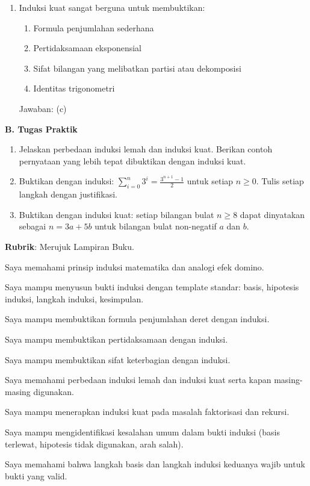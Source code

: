 \documentclass[../main]{subfiles}
\begin{document}
\begin{asesmen}
\begin{enumerate}
  \item Induksi kuat sangat berguna untuk membuktikan:
  \begin{enumerate}
    \item Formula penjumlahan sederhana
    \item Pertidaksamaan eksponensial
    \item Sifat bilangan yang melibatkan partisi atau dekomposisi
    \item Identitas trigonometri
  \end{enumerate}
  Jawaban: (c)
\end{enumerate}

\textbf{B. Tugas Praktik}
\begin{enumerate}
  \item Jelaskan perbedaan induksi lemah dan induksi kuat. Berikan contoh pernyataan yang lebih tepat dibuktikan dengan induksi kuat.
  \item Buktikan dengan induksi: $\sum_{i=0}^{n} 3^i = \frac{3^{n+1} - 1}{2}$ untuk setiap $n \geq 0$. Tulis setiap langkah dengan justifikasi.
  \item Buktikan dengan induksi kuat: setiap bilangan bulat $n \geq 8$ dapat dinyatakan sebagai $n = 3a + 5b$ untuk bilangan bulat non-negatif $a$ dan $b$.
\end{enumerate}

\textbf{Rubrik}: Merujuk Lampiran Buku.
\end{asesmen}


\begin{checklist}
  \item Saya memahami prinsip induksi matematika dan analogi efek domino.
  \item Saya mampu menyusun bukti induksi dengan template standar: basis, hipotesis induksi, langkah induksi, kesimpulan.
  \item Saya mampu membuktikan formula penjumlahan deret dengan induksi.
  \item Saya mampu membuktikan pertidaksamaan dengan induksi.
  \item Saya mampu membuktikan sifat keterbagian dengan induksi.
  \item Saya memahami perbedaan induksi lemah dan induksi kuat serta kapan masing-masing digunakan.
  \item Saya mampu menerapkan induksi kuat pada masalah faktorisasi dan rekursi.
  \item Saya mampu mengidentifikasi kesalahan umum dalam bukti induksi (basis terlewat, hipotesis tidak digunakan, arah salah).
  \item Saya memahami bahwa langkah basis dan langkah induksi keduanya wajib untuk bukti yang valid.
\end{checklist}
\end{document}
